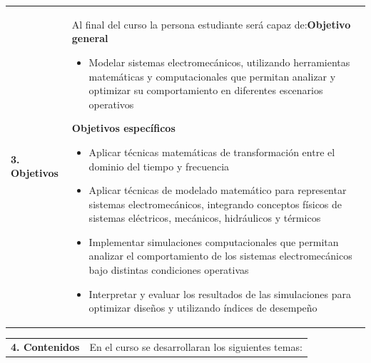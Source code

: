 \documentclass[letterpaper]{article}%
\begin{document}
\begin{tabularx}{\textwidth}{p{3cm}p{13cm}}%
\par\fontsize{12}{14}\selectfont \textbf{\textcolor{parte}{3. Objetivos}}&Al final del curso la persona estudiante será capaz de:\newline\newline \textbf{Objetivo general}\begin{itemize}\item Modelar sistemas electromecánicos, utilizando herramientas matemáticas y computacionales que permitan analizar y optimizar su comportamiento en diferentes escenarios operativos\end{itemize} \vspace{2mm}\textbf{Objetivos específicos}\begin{itemize}\item Aplicar técnicas matemáticas de transformación entre el dominio del tiempo y frecuencia\item Aplicar técnicas de modelado matemático para representar sistemas electromecánicos, integrando conceptos físicos de sistemas eléctricos, mecánicos, hidráulicos y térmicos\item Implementar simulaciones computacionales que permitan analizar el comportamiento de los sistemas electromecánicos bajo distintas condiciones operativas\item Interpretar y evaluar los resultados de las simulaciones para optimizar diseños y utilizando índices de desempeño\end{itemize}\\%
\end{tabularx}%
\newpage%
\begin{tabularx}{\textwidth}{p{3cm}p{13cm}}%
\par\fontsize{12}{14}\selectfont \textbf{\textcolor{parte}{4. Contenidos}}&En el curso se desarrollaran los siguientes temas:\\%
\end{tabularx}%
\newline%
\end{document}
